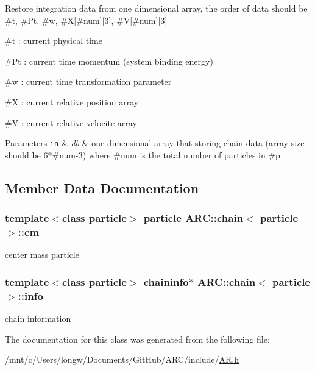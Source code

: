 Restore integration data from one dimensional array, the order of data should be \#t, \#\+Pt, \#w, \#X\mbox{[}\#num\mbox{]}\mbox{[}3\mbox{]}, \#V\mbox{[}\#num\mbox{]}\mbox{[}3\mbox{]}
\begin{DoxyItemize}
\item \#t \+: current physical time
\item \#\+Pt \+: current time momentum (system binding energy)
\item \#w \+: current time transformation parameter
\item \#X \+: current relative position array
\item \#V \+: current relative velocite array 
\begin{DoxyParams}[1]{Parameters}
\mbox{\tt in}  & {\em db} & one dimensional array that storing chain data (array size should be 6$\ast$\#num-\/3) where \#num is the total number of particles in \#p \\
\hline
\end{DoxyParams}

\end{DoxyItemize}

\subsection{Member Data Documentation}
\subsubsection[{\texorpdfstring{cm}{cm}}]{\setlength{\rightskip}{0pt plus 5cm}template$<$class particle$>$ particle {\bf A\+R\+C\+::chain}$<$ particle $>$\+::cm}\hypertarget{classARC_1_1chain_ae9f6a5cbf7aac2b33c7274e7e10916ed}{}\label{classARC_1_1chain_ae9f6a5cbf7aac2b33c7274e7e10916ed}


center mass particle 

\subsubsection[{\texorpdfstring{info}{info}}]{\setlength{\rightskip}{0pt plus 5cm}template$<$class particle$>$ {\bf chaininfo}$\ast$ {\bf A\+R\+C\+::chain}$<$ particle $>$\+::info}\hypertarget{classARC_1_1chain_add4ef2186b8ed203eeadc8c17c4c73ef}{}\label{classARC_1_1chain_add4ef2186b8ed203eeadc8c17c4c73ef}


chain information 



The documentation for this class was generated from the following file\+:\begin{DoxyCompactItemize}
\item 
/mnt/c/\+Users/longw/\+Documents/\+Git\+Hub/\+A\+R\+C/include/\hyperlink{AR_8h}{A\+R.\+h}\end{DoxyCompactItemize}
